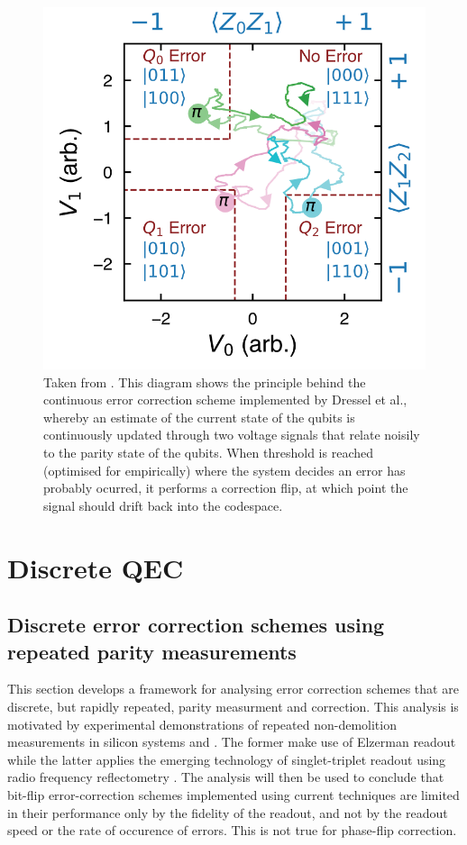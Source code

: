 \documentclass{report}
\begin{document}
\begin{figure}[ht]
    \centering
    \includegraphics[scale = 0.3]{Figures/dresseldiagram.png}
    \caption{Taken from \cite{Dressel2022}. This diagram shows the principle behind the continuous error correction scheme implemented by Dressel et al., whereby an estimate of the current state of the qubits is continuously updated through two voltage signals that relate noisily to the parity state of the qubits. When threshold is reached (optimised for empirically) where the system decides an error has probably ocurred, it performs a correction flip, at which point the signal should drift back into the codespace.}
    \label{fig:dresseldiagram}
\end{figure}


\chapter{Discrete QEC}


\section{Discrete error correction schemes using repeated parity measurements} \label{sec:repeat_analysis}
This section develops a framework for analysing error correction schemes that are discrete, but rapidly repeated, parity measurment and correction. This analysis is motivated by experimental demonstrations of repeated non-demolition measurements in silicon systems \cite{Xue2020} and \cite{Nakajima2019}. The former make use of Elzerman readout\cite{Elzerman2004} while the latter applies the emerging technology of singlet-triplet readout using radio frequency reflectometry \cite{Oakes2022}. The analysis will then be used to conclude that bit-flip error-correction schemes implemented using current techniques are limited in their performance only by the fidelity of the readout, and not by the readout speed or the rate of occurence of errors. This is not true for phase-flip correction. 
\end{document}
